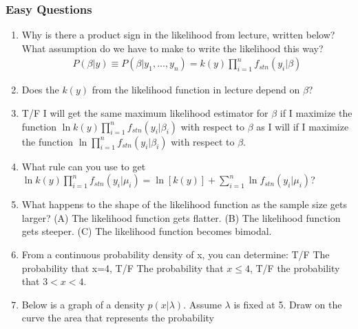 \documentclass[11pt]{article}
\begin{document}
\subsubsection{Easy Questions}
\begin{enumerate}
\item Why is there a product sign in the likelihood from lecture, written below? What assumption do we have to make to write the likelihood this way? 
\begin{eqnarray*}
P(\beta|y) \equiv P(\beta|y_1,\ldots,y_n) = k(y)\prod_{i=1}^n f_{stn}(y_i|\beta)
\end{eqnarray*}
\item Does the $k(y)$ from the likelihood function in lecture depend on $\beta$? 
\item T/F I will get the same maximum likelihood estimator for $\beta$ if I maximize the function $\ln{k(y)\prod_{i=1}^n f_{stn}(y_i|\beta_i)}$ with respect to $\beta$ as I will if I maximize the function $\ln{\prod_{i=1}^n f_{stn}(y_i|\beta_i)}$ with respect to $\beta$. 
\item What rule can you use to get $\ln{k(y)\prod_{i=1}^n f_{stn}(y_i|\mu_i)} = \ln{[k(y)]} + \sum_{i=1}^n\ln{f_{stn}(y_i|\mu_i)}$? 
\item What happens to the shape of the likelihood function as the sample size gets larger? (A) The likelihood function gets flatter.  (B) The likelihood function gets steeper. (C) The likelihood function becomes bimodal. 
\item From a continuous probability density of x, you can determine:  T/F The probability that x=4, T/F The probability that $x\leq4$, T/F the probability that  $3<x<4$. 
\item Below is a graph of a density $p(x|\lambda)$.  Assume $\lambda$ is fixed at 5. Draw on the curve the area that represents the probability %
\begin{center}

\end{center}
\end{enumerate}
\end{document}
